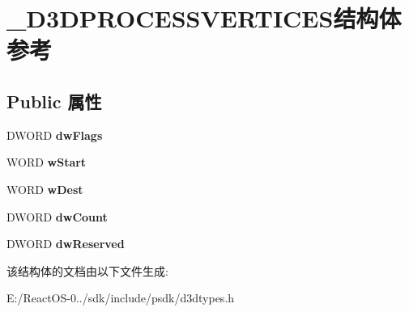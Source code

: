 \hypertarget{struct___d3_d_p_r_o_c_e_s_s_v_e_r_t_i_c_e_s}{}\section{\+\_\+\+D3\+D\+P\+R\+O\+C\+E\+S\+S\+V\+E\+R\+T\+I\+C\+E\+S结构体 参考}
\label{struct___d3_d_p_r_o_c_e_s_s_v_e_r_t_i_c_e_s}
\subsection*{Public 属性}
\begin{DoxyCompactItemize}
\item 
\mbox{\label{struct___d3_d_p_r_o_c_e_s_s_v_e_r_t_i_c_e_s_ae93bdb13d149ad0025b38ac093a74e55}} 
D\+W\+O\+RD {\bfseries dw\+Flags}
\item 
\mbox{\label{struct___d3_d_p_r_o_c_e_s_s_v_e_r_t_i_c_e_s_af316d7e5987d93496f6fd20e6c923b2c}} 
W\+O\+RD {\bfseries w\+Start}
\item 
\mbox{\label{struct___d3_d_p_r_o_c_e_s_s_v_e_r_t_i_c_e_s_aea2233f177254289a0464d1f327d5a57}} 
W\+O\+RD {\bfseries w\+Dest}
\item 
\mbox{\label{struct___d3_d_p_r_o_c_e_s_s_v_e_r_t_i_c_e_s_a739ddd9f4f85e9e240d39c6534a2611e}} 
D\+W\+O\+RD {\bfseries dw\+Count}
\item 
\mbox{\label{struct___d3_d_p_r_o_c_e_s_s_v_e_r_t_i_c_e_s_a8a6ebf97eada9628a47f08ffbf2d36d0}} 
D\+W\+O\+RD {\bfseries dw\+Reserved}
\end{DoxyCompactItemize}


该结构体的文档由以下文件生成\+:\begin{DoxyCompactItemize}
\item 
E\+:/\+React\+O\+S-\/0../sdk/include/psdk/d3dtypes.\+h\end{DoxyCompactItemize}
